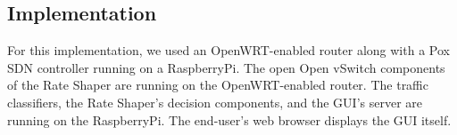 \subsection{Implementation}
For this implementation, we used an OpenWRT-enabled router along with a Pox SDN controller running on a RaspberryPi. The open Open vSwitch components of the Rate Shaper are running on the OpenWRT-enabled router. The traffic classifiers, the Rate Shaper's decision components, and the GUI's server are running on the RaspberryPi. The end-user's web browser displays the GUI itself.

